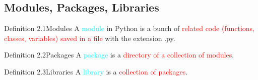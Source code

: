 \documentclass{book}
\begin{document}
\subsection{Modules, Packages, Libraries}
\begin{defBox}{Definition 2.1}{Modules}
    A \textcolor{cyan}{module} in Python is a bunch of \textcolor{red}{related code (functions, classes, variables) saved in a file} with the extension .py.
\end{defBox}
\begin{defBox}{Definition 2.2}{Packages}
    A \textcolor{cyan}{package} is a \textcolor{red}{directory of a collection of modules}.
\end{defBox}
\begin{defBox}{Definition 2.3}{Libraries}
    A \textcolor{cyan}{library} is a \textcolor{red}{collection of packages}.
\end{defBox}
\newpage
\end{document}
